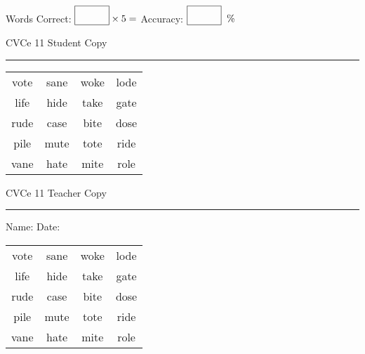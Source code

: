 \documentclass{memoir}
\begin{document}
\small

Words Correct: $\fbox{\phantom{\huge 100}} \times 5 = $ Accuracy: $\fbox{\phantom{\huge 100}}\;\; \%$ 

\vfill

\newpage


\footnotesize \noindent
CVCe 11 \hfill Student Copy
\smallskip
\hrule

\Large

\setlength{\tabcolsep}{14pt}
\def\arraystretch{2}

{\selectfont


\begin{vplace}[0.5]
\begin{center}
\begin{tabular}{cccc}
vote & sane & woke & lode \\
life & hide & take & gate \\
rude & case & bite & dose \\
pile & mute & tote & ride \\
vane & hate & mite & role \\
\end{tabular}
\end{center}
\end{vplace}

}

\newpage

\footnotesize \noindent
CVCe 11 \hfill Teacher Copy
\smallskip
\hrule

\small

\vfill

\noindent
Name: \underline{\hspace{1.75in}} \hfill Date: \underline{\hspace{1in}}

\Large

{\selectfont


\begin{vplace}[0.5]
\begin{center}
\begin{tabular}{cccc}
vote & sane & woke & lode \\
life & hide & take & gate \\
rude & case & bite & dose \\
pile & mute & tote & ride \\
vane & hate & mite & role \\
\end{tabular}
\end{center}
\end{vplace}



}
\end{document}
